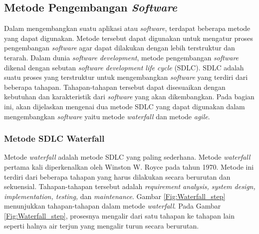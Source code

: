 

\subsection{Metode Pengembangan \textit{Software}}
Dalam mengembangkan suatu aplikasi atau \textit{software}, terdapat beberapa metode yang dapat digunakan. 
Metode tersebut dapat digunakan untuk mengatur proses pengembangan \textit{software} agar dapat 
dilakukan dengan lebih terstruktur dan terarah. Dalam dunia \textit{software development}, metode 
pengembangan \textit{software} dikenal dengan sebutan \textit{software development life cycle} (SDLC). 
SDLC adalah suatu proses yang terstruktur untuk mengembangkan \textit{software} yang terdiri dari 
beberapa tahapan. Tahapan-tahapan tersebut dapat disesuaikan dengan kebutuhan dan karakteristik 
dari \textit{software} yang akan dikembangkan. Pada bagian ini, akan dijelaskan mengenai 
dua metode SDLC yang dapat digunakan dalam mengembangkan \textit{software} yaitu metode 
\textit{waterfall} dan metode \textit{agile}.

\subsubsection{Metode SDLC Waterfall}
Metode \textit{waterfall} adalah metode SDLC yang paling sederhana. Metode \textit{waterfall} 
pertama kali diperkenalkan oleh Winston W. Royce pada tahun 1970\cite{bassil_simulation_2012}. Metode ini terdiri dari 
beberapa tahapan yang harus dilakukan secara berurutan dan sekuensial. Tahapan-tahapan tersebut adalah 
\textit{requirement analysis, system design, implementation, testing,} dan \textit{maintenance}. 
Gambar \ref{Fig:Waterfall_step} menunjukkan tahapan-tahapan dalam metode \textit{waterfall}. 
Pada Gambar \ref{Fig:Waterfall_step}, prosesnya mengalir dari satu tahapan ke tahapan lain 
seperti halnya air terjun yang mengalir turun secara berurutan.

